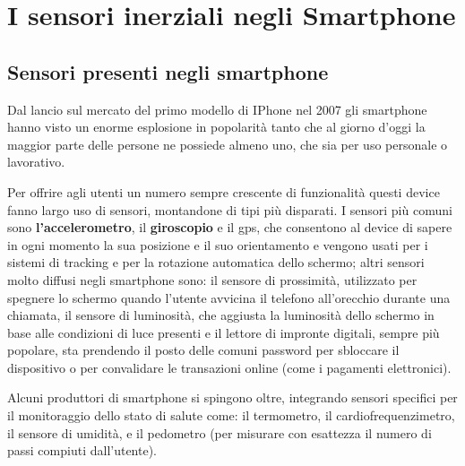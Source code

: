 \chapter{I sensori inerziali negli Smartphone}
\label{cap:i_sensori_inerziali_negli_smartphone}

\section{Sensori presenti negli smartphone}
Dal lancio sul mercato del primo modello di IPhone nel 2007 gli smartphone hanno visto un enorme esplosione in popolarità tanto che al giorno d'oggi la maggior parte delle persone ne possiede almeno uno, che sia per uso personale o lavorativo.

Per offrire agli utenti un numero sempre crescente di funzionalità questi device fanno largo uso di sensori, montandone di tipi più disparati. I sensori più comuni sono {\bfseries l'accelerometro}, il {\bfseries giroscopio} e il gps, che consentono al device di sapere in ogni momento la sua posizione e il suo orientamento e vengono usati per i sistemi di tracking e per la rotazione automatica dello schermo; altri sensori molto diffusi negli smartphone sono: il sensore di prossimità, utilizzato per spegnere lo schermo quando l'utente avvicina il telefono all'orecchio durante una chiamata, il sensore di luminosità, che aggiusta la luminosità dello schermo in base alle condizioni di luce presenti e il lettore di impronte digitali, sempre più popolare, sta prendendo il posto delle comuni password per sbloccare il dispositivo o per convalidare le transazioni online (come i pagamenti elettronici).

Alcuni produttori di smartphone si spingono oltre, integrando sensori specifici per il monitoraggio dello stato di salute come: il termometro, il cardiofrequenzimetro, il sensore di umidità, e il pedometro (per misurare con esattezza il numero di passi compiuti dall'utente).

